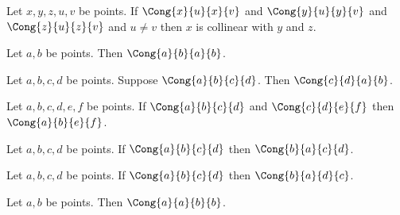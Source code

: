 

\begin{axiom}\label{upperdim} %
    Let $x,y,z,u,v$ be points.
    If $\Cong{x}{u}{x}{v}$ and $\Cong{y}{u}{y}{v}$
    and $\Cong{z}{u}{z}{v}$ and $u \neq v$
    then $x$ is collinear with $y$ and $z$.
\end{axiom}




\begin{lemma}\label{cong_refl} %
    Let $a, b$ be points.
    Then $\Cong{a}{b}{a}{b}$.
\end{lemma}


\begin{lemma}\label{cong_sym} %
    Let $a, b, c, d$ be points.
    Suppose $\Cong{a}{b}{c}{d}$.
    Then $\Cong{c}{d}{a}{b}$.
\end{lemma}


\begin{lemma}\label{cong_transitive} %
    Let $a, b, c, d, e, f$ be points.
    If $\Cong{a}{b}{c}{d}$ and $\Cong{c}{d}{e}{f}$
    then $\Cong{a}{b}{e}{f}$.
\end{lemma}


\begin{lemma}\label{cong_shuffle_left} %
    Let $a, b, c, d$ be points.
    If $\Cong{a}{b}{c}{d}$
    then $\Cong{b}{a}{c}{d}$.
\end{lemma}


\begin{lemma}\label{cong_shuffle_right} %
    Let $a, b, c, d$ be points.
    If $\Cong{a}{b}{c}{d}$
    then $\Cong{b}{a}{d}{c}$.
\end{lemma}


\begin{lemma}\label{cong_zero} %
    Let $a,b$ be points.
    Then $\Cong{a}{a}{b}{b}$.
\end{lemma}

